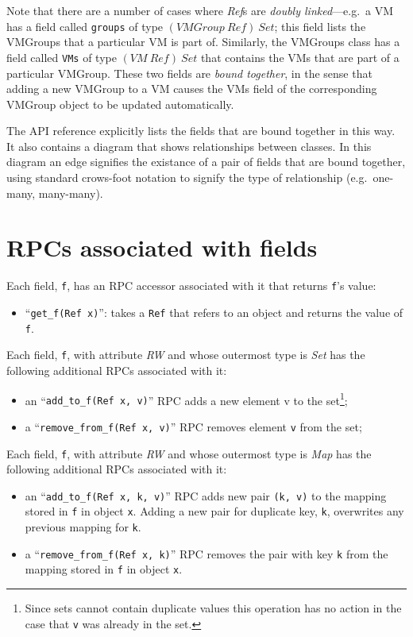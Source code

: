 Note that there are a number of cases where {\em Ref}s are {\em doubly
linked\/}---e.g.\ a VM has a field called {\tt groups} of type
$(\mathit{VMGroup}~\mathit{Ref})~\mathit{Set}$; this field lists
the VMGroups that a particular VM is part of. Similarly, the VMGroups
class has a field called {\tt VMs} of type $(\mathit{VM}~{\mathit
Ref})~\mathit{Set}$ that contains the VMs that are part of a particular
VMGroup. These two fields are {\em bound together\/}, in the sense that
adding a new VMGroup to a VM causes the VMs field of the corresponding
VMGroup object to be updated automatically.

The API reference explicitly lists the fields that are
bound together in this way. It also contains a diagram that shows
relationships between classes. In this diagram an edge signifies the
existance of a pair of fields that are bound together, using standard
crows-foot notation to signify the type of relationship (e.g.\
one-many, many-many).

\section{RPCs associated with fields}

Each field, {\tt f}, has an RPC accessor associated with it
that returns {\tt f}'s value:
\begin{itemize}
\item ``{\tt get\_f(Ref x)}'': takes a
{\tt Ref} that refers to an object and returns the value of {\tt f}.
\end{itemize}

Each field, {\tt f}, with attribute
{\em RW} and whose outermost type is {\em Set\/} has the following
additional RPCs associated with it:
\begin{itemize}
\item an ``{\tt add\_to\_f(Ref x, v)}'' RPC adds a new element v to the set\footnote{
%
Since sets cannot contain duplicate values this operation has no action in the case
that {\tt v} was already in the set.
%
};
\item a ``{\tt remove\_from\_f(Ref x, v)}'' RPC removes element {\tt v} from the set;
\end{itemize}

Each field, {\tt f}, with attribute
{\em RW} and whose outermost type is {\em Map\/} has the following
additional RPCs associated with it:
\begin{itemize}
\item an ``{\tt add\_to\_f(Ref x, k, v)}'' RPC adds new pair {\tt (k, v)}
to the mapping stored in {\tt f} in object {\tt x}. Adding a new pair for duplicate
key, {\tt k}, overwrites any previous mapping for {\tt k}.
\item a ``{\tt remove\_from\_f(Ref x, k)}'' RPC removes the pair with key {\tt k}
from the mapping stored in {\tt f} in object {\tt x}.
\end{itemize}

